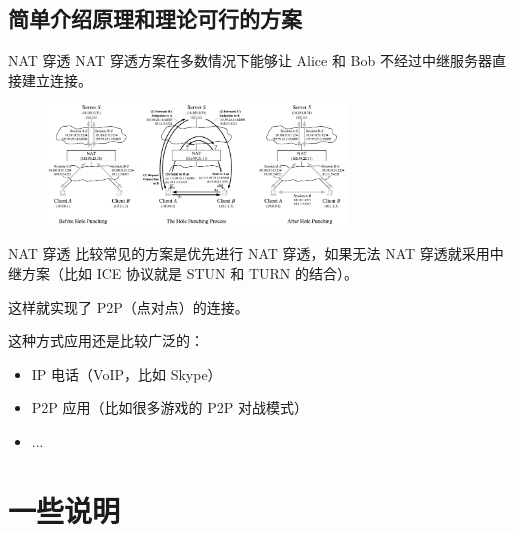 \subsection{简单介绍原理和理论可行的方案}

\begin{xframe}{NAT 穿透}
	NAT 穿透方案在多数情况下能够让 Alice 和 Bob 不经过中继服务器直接建立连接。
	
	\begin{figure}[h]
		\includegraphics[width=300px]{img8.png}
	\end{figure}
\end{xframe}

\begin{xframe}{NAT 穿透}
	比较常见的方案是优先进行 NAT 穿透，如果无法 NAT 穿透就采用中继方案（比如 ICE 协议就是 STUN 和 TURN 的结合）。
	
	这样就实现了 P2P（点对点）的连接。\pause
	
	这种方式应用还是比较广泛的：
	
	\begin{itemize}
		\item IP 电话（VoIP，比如 Skype）
		\item P2P 应用（比如很多游戏的 P2P 对战模式） %
		\item ...
	\end{itemize}
\end{xframe}



\section{一些说明}

